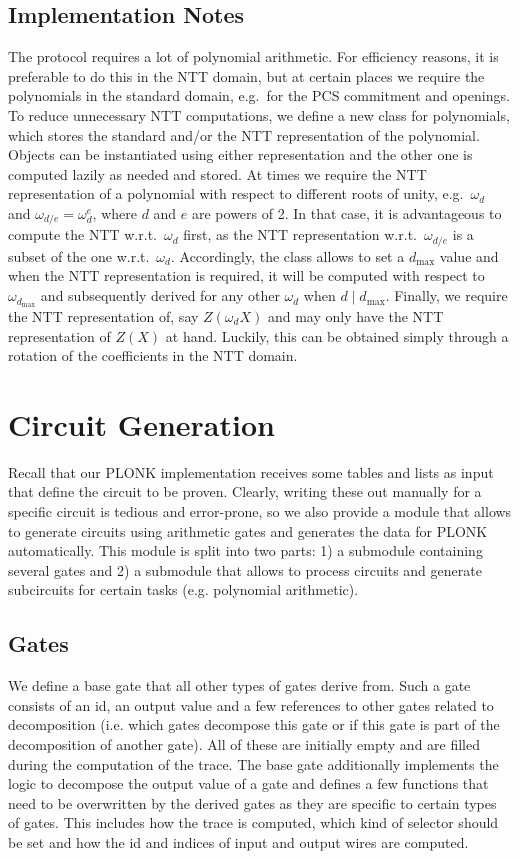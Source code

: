 \documentclass[final]{zamarep}
\begin{document}
\subsection{Implementation Notes}
\label{sec:notes}
The protocol requires a lot of polynomial arithmetic. For efficiency reasons, it is preferable to do this in the NTT domain, but at certain places we require the polynomials in the standard domain, e.g.\ for the PCS commitment and openings. To reduce unnecessary NTT computations, we define a new class for polynomials, which stores the standard and/or the NTT representation of the polynomial. Objects can be instantiated using either representation and the other one is computed lazily as needed and stored. At times we require the NTT representation of a polynomial with respect to different roots of unity, e.g.\ $\omega_d$ and $\omega_{d/e} = \omega_d^e$, where $d$ and $e$ are powers of 2. In that case, it is advantageous to compute the NTT w.r.t.\ $\omega_d$ first, as the NTT representation w.r.t.\ $\omega_{d/e}$ is a subset of the one w.r.t.\ $\omega_d$. Accordingly, the class allows to set a $d_{\max}$ value and when the NTT representation is required, it will be computed with respect to $\omega_{d_{\max}}$ and subsequently derived for any other $\omega_{d}$ when $d \mid d_{\max} $. Finally, we require the NTT representation of, say $Z(\omega_d X)$ and may only have the NTT representation of $Z(X)$ at hand. Luckily, this can be obtained simply through a rotation of the coefficients in the NTT domain.

\section{Circuit Generation}
\label{sec:circuit_gen}
Recall that our PLONK implementation receives some tables and lists as input that define the circuit to be proven. Clearly, writing these out manually for a specific circuit is tedious and error-prone, so we also provide a module that allows to generate circuits using arithmetic gates and generates the data for PLONK automatically. This module is split into two parts: 1) a submodule containing several gates and 2) a submodule that allows to process circuits and generate subcircuits for certain tasks (e.g. polynomial arithmetic).

\subsection{Gates}
\label{sec:gates}
We define a base gate that all other types of gates derive from. Such a gate consists of an id, an output value and a few references to other gates related to decomposition (i.e. which gates decompose this gate or if this gate is part of the decomposition of another gate). All of these are initially empty and are filled during the computation of the trace. The base gate additionally implements the logic to decompose the output value of a gate and defines a few functions that need to be overwritten by the derived gates as they are specific to certain types of gates. This includes how the trace is computed, which kind of selector should be set and how the id and indices of input and output wires are computed.
\end{document}
